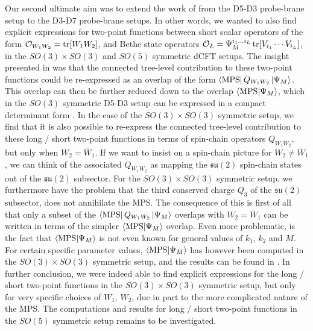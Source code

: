 Our second ultimate aim was to extend the work of \cite{Length L length 2 two-point functions D5-D3} from the D5-D3 probe-brane setup to the D3-D7 probe-brane setups. In other words, we wanted to also find explicit expressions for two-point functions between short scalar operators of the form $\mathcal{O}_{W_1 W_2} = \tr[W_1 W_2]$, and Bethe state operators $\mathcal{O}_{L} = \Psi_M^{i_1 \ldots i_L} \tr[V_{i_1} \cdots V_{i_L}]$, in the $SO(3) \times SO(3)$ and $SO(5)$ symmetric dCFT setups. The insight presented in \cite{Length L length 2 two-point functions D5-D3} was that the connected tree-level contribution to these two-point functions could be re-expressed as an overlap of the form $\bra{\text{MPS}} Q_{W_1 W_2} \ket{\Psi_M}$. This overlap can then be further reduced down to the overlap $\braket{\text{MPS}}{\Psi_M}$, which in the $SO(3)$ symmetric D5-D3 setup can be expressed in a compact determinant form \cite{non-protected one-point functions}. In the case of the $SO(3) \times SO(3)$ symmetric setup, we find that it is also possible to re-express the connected tree-level contribution to these long / short two-point functions in terms of spin-chain operators $Q_{W_1 W_2}$, but only when $W_2 = \bar{W}_1$. If we want to insist on a spin-chain picture for $W_2 \neq \bar{W}_1$, we can think of the associated $Q_{W_1 W_2}$ as mapping the $\mathfrak{su}(2)$ spin-chain states out of the $\mathfrak{su}(2)$ subsector. For the $SO(3) \times SO(3)$ symmetric setup, we furthermore have the problem that the third conserved charge $Q_3$ of the $\mathfrak{su}(2)$ subsector, does not annihilate the MPS. The consequence of this is first of all that only a subset of the $\bra{\text{MPS}} Q_{W_1 W_2} \ket{\Psi_M}$ overlaps with $W_2 = \bar{W}_1$ can be written in terms of the simpler $\braket{\text{MPS}}{\Psi_M}$ overlap. Even more problematic, is the fact that $\braket{\text{MPS}}{\Psi_M}$ is not even known for general values of $k_1$, $k_2$ and $M$. For certain specific parameter values, $\braket{\text{MPS}}{\Psi_M}$ has however been computed in the $SO(3) \times SO(3)$ symmetric setup, and the results can be found in \cite{Lack of integrability in SO(3)xSO(3)}. In further conclusion, we were indeed able to find explicit expressions for the long / short two-point functions in the $SO(3) \times SO(3)$ symmetric setup, but only for very specific choices of $W_1$, $W_2$, due in part to the more complicated nature of the MPS. The computations and results for long / short two-point functions in the $SO(5)$ symmetric setup remains to be investigated.\\
